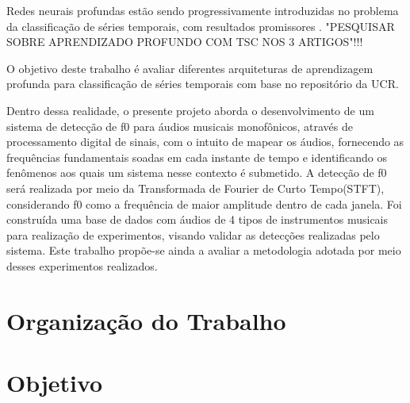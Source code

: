Redes neurais profundas estão sendo progressivamente introduzidas no problema da classificação de séries temporais, com resultados promissores \cite{Zheng2014} \cite{Wang01}  \cite{tscFromScratch}. "PESQUISAR SOBRE APRENDIZADO PROFUNDO COM TSC NOS 3 ARTIGOS"!!!

O objetivo deste trabalho é avaliar diferentes arquiteturas de aprendizagem profunda para classificação de séries temporais com base no repositório da UCR.

Dentro dessa realidade, o presente projeto aborda o desenvolvimento de um sistema de detecção de f0 para áudios musicais monofônicos, através de processamento digital de sinais, com o intuito de mapear os áudios, fornecendo as frequências fundamentais soadas em cada instante de tempo e identificando os fenômenos aos quais um sistema nesse contexto é submetido. A detecção de f0 será realizada por meio da Transformada de Fourier de Curto Tempo(STFT), considerando f0 como a frequência de maior amplitude dentro de cada janela. Foi construída uma base de dados com áudios de 4 tipos de instrumentos musicais para realização de experimentos, visando validar as detecções realizadas pelo sistema. Este trabalho propõe-se ainda a avaliar a metodologia adotada por meio desses experimentos realizados. 
\section{Organização do Trabalho}




\section{Objetivo}

